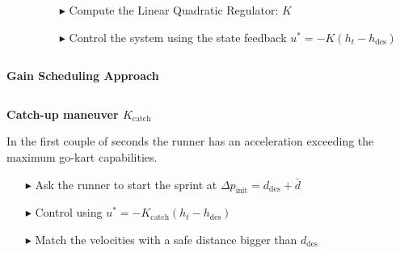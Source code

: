 \documentclass[9pt, aspectratio=169]{beamer}
\begin{document}
\begin{frame}
\begin{columns}
\begin{column}{0.4\textwidth}
\end{column}

\begin{column}{0.6\textwidth}
\centering
\begin{itemize}
	\footnotesize
	\item[$\blacktriangleright$] Compute the Linear Quadratic Regulator: $K$
	\item[$\blacktriangleright$] Control the system using the state feedback $u^* = - K (h_t - h_{\text{des}}) $
\end{itemize}
\end{column}
\end{columns}

\vspace{1.0cm}
\centering
{}\textcolor{emph@Thesis}{\textbf{\small{Gain Scheduling Approach}}} 

\begin{columns}
\begin{column}{0.5\textwidth}
\vspace{0.2cm}
\begin{block}{}
\centering
\textbf{Catch-up maneuver $K_\text{catch}$} \\
\end{block}
In the first couple of seconds the runner has an acceleration exceeding the maximum go-kart capabilities.
\begin{itemize}
\vspace{0.1cm}
\footnotesize
	\item[$\blacktriangleright$] Ask the runner to start the sprint at $\Delta p_\text{init} = d_\text{des} + \bar{d}$
	\item[$\blacktriangleright$] Control using $u^* = - K_\text{catch} (h_t - h_{\text{des}}) $
	\item[$\blacktriangleright$] Match the velocities with a safe distance bigger than $d_\text{des}$
\end{itemize}


\end{column}
\end{columns}
\end{frame}
\end{document}
